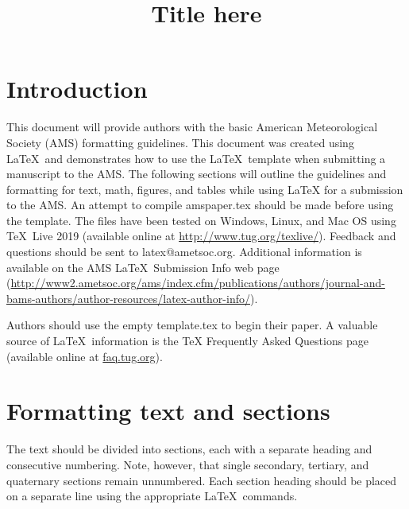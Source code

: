 \documentclass{ametsocV5}
\title{Title here}
\affiliation{American Meteorological Society, 
     Boston, Massachusetts}
\begin{document}
\maketitle

%
%
%


%
\section{Introduction}

This document will provide authors with the basic American Meteorological
Society (AMS) formatting guidelines. This document was created using \LaTeX\
and demonstrates how to use the \LaTeX\ template when submitting a manuscript
to the AMS.  The following sections will outline the guidelines and
formatting for text, math, figures, and tables while using \LaTeX\/ for a
submission to the AMS. An attempt to compile amspaper.tex should be made
before using the template. The files have been tested on Windows, Linux, and
Mac OS using \TeX\ Live 2019 (available online at
\url{http://www.tug.org/texlive/}). Feedback and questions should be sent to
latex@ametsoc.org. Additional information is available on the AMS \LaTeX\ Submission Info
web page (\url{http://www2.ametsoc.org/ams/index.cfm/publications/authors/journal-and-bams-authors/author-resources/latex-author-info/}).

Authors should use the empty template.tex to begin their
paper. A valuable source of \LaTeX\ information is the {TeX
Frequently Asked Questions} page (available online at \url{faq.tug.org}).

\section{Formatting text and sections}
The text should be divided into sections, each with a separate heading and
consecutive numbering. Note, however, that single secondary, tertiary, and
quaternary sections remain unnumbered. Each section heading should be placed
on a separate line using the appropriate \LaTeX\ commands. 
\end{document}
